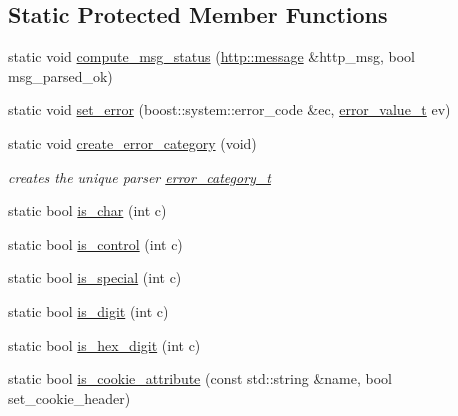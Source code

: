 \subsection*{Static Protected Member Functions}
\begin{DoxyCompactItemize}
\item 
static void \hyperlink{classpion_1_1http_1_1parser_a50628b4ffc6ab8f0cf46873d6e8075bb}{compute\-\_\-msg\-\_\-status} (\hyperlink{classpion_1_1http_1_1message}{http\-::message} \&http\-\_\-msg, bool msg\-\_\-parsed\-\_\-ok)
\item 
static void \hyperlink{classpion_1_1http_1_1parser_a0d8875ea346743ed37ae0cd7c2a73672}{set\-\_\-error} (boost\-::system\-::error\-\_\-code \&ec, \hyperlink{classpion_1_1http_1_1parser_a056c791c4b2dda0dd4c2037dd941d5d8}{error\-\_\-value\-\_\-t} ev)
\item 
static void \hyperlink{classpion_1_1http_1_1parser_ad16455747863108b62c77d89bd5dcf0d}{create\-\_\-error\-\_\-category} (void)
\begin{DoxyCompactList}\small\item\em creates the unique parser \hyperlink{classpion_1_1http_1_1parser_1_1error__category__t}{error\-\_\-category\-\_\-t} \end{DoxyCompactList}\item 
static bool \hyperlink{classpion_1_1http_1_1parser_aa1099c00a26a33a615dfd54fd945873c}{is\-\_\-char} (int c)
\item 
static bool \hyperlink{classpion_1_1http_1_1parser_aaf665f61057ffc430746134b88f20d11}{is\-\_\-control} (int c)
\item 
static bool \hyperlink{classpion_1_1http_1_1parser_a0e5e96ae29b09b95e407eb63403fa2a3}{is\-\_\-special} (int c)
\item 
static bool \hyperlink{classpion_1_1http_1_1parser_add90b4c4bb8cc44eb79d2e6ba989ae9a}{is\-\_\-digit} (int c)
\item 
static bool \hyperlink{classpion_1_1http_1_1parser_a3d83fdf4309c2b57284759948b2bbc4b}{is\-\_\-hex\-\_\-digit} (int c)
\item 
static bool \hyperlink{classpion_1_1http_1_1parser_abeb585af8111e5a5f99d1ce87f6e107b}{is\-\_\-cookie\-\_\-attribute} (const std\-::string \&name, bool set\-\_\-cookie\-\_\-header)
\end{DoxyCompactItemize}
